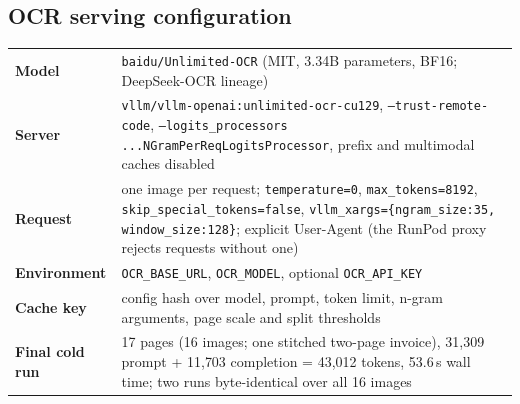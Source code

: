 \documentclass[11pt,a4paper]{article}
\begin{document}
\subsection{OCR serving configuration}
\begin{tabularx}{\textwidth}{>{\bfseries}p{4cm} X}
\toprule
Model & \texttt{baidu/Unlimited-OCR} (MIT, 3.34B parameters, BF16; DeepSeek-OCR lineage)\\
Server & \texttt{vllm/vllm-openai:unlimited-ocr-cu129}, \texttt{--trust-remote-code}, \texttt{--logits\_processors ...NGramPerReqLogitsProcessor}, prefix and multimodal caches disabled\\
Request & one image per request; \texttt{temperature=0}, \texttt{max\_tokens=8192}, \texttt{skip\_special\_tokens=false}, \texttt{vllm\_xargs=\{ngram\_size:35, window\_size:128\}}; explicit User-Agent (the RunPod proxy rejects requests without one)\\
Environment & \texttt{OCR\_BASE\_URL}, \texttt{OCR\_MODEL}, optional \texttt{OCR\_API\_KEY}\\
Cache key & config hash over model, prompt, token limit, n-gram arguments, page scale and split thresholds\\
Final cold run & 17 pages (16 images; one stitched two-page invoice), 31{,}309 prompt + 11{,}703 completion = 43{,}012 tokens, 53.6\,s wall time; two runs byte-identical over all 16 images\\
\bottomrule
\end{tabularx}
\end{document}
